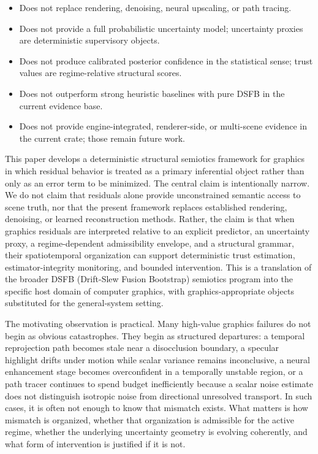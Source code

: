 \documentclass[11pt,letterpaper]{article}
\theoremstyle{gcresult}
\theoremstyle{definition}
\begin{document}
\begin{tcolorbox}[colback=gray!6,colframe=black!35,title={\small\textbf{What this framework does not do}},
  fonttitle=\bfseries,boxrule=0.4pt,left=4pt,right=4pt,top=3pt,bottom=3pt]
\small
\begin{itemize}[leftmargin=1.2em,topsep=2pt,itemsep=1pt]
  \item Does not replace rendering, denoising, neural upscaling, or path tracing.
  \item Does not provide a full probabilistic uncertainty model; uncertainty proxies are deterministic supervisory objects.
  \item Does not produce calibrated posterior confidence in the statistical sense; trust values are regime-relative structural scores.
  \item Does not outperform strong heuristic baselines with pure DSFB in the current evidence base.
  \item Does not provide engine-integrated, renderer-side, or multi-scene evidence in the current crate; those remain future work.
\end{itemize}
\end{tcolorbox}

This paper develops a deterministic structural semiotics framework for graphics in which residual behavior is treated as a primary inferential object rather than only as an error term to be minimized. The central claim is intentionally narrow. We do not claim that residuals alone provide unconstrained semantic access to scene truth, nor that the present framework replaces established rendering, denoising, or learned reconstruction methods. Rather, the claim is that when graphics residuals are interpreted relative to an explicit predictor, an uncertainty proxy, a regime-dependent admissibility envelope, and a structural grammar, their spatiotemporal organization can support deterministic trust estimation, estimator-integrity monitoring, and bounded intervention. This is a translation of the broader DSFB (Drift-Slew Fusion Bootstrap) semiotics program into the specific host domain of computer graphics, with graphics-appropriate objects substituted for the general-system setting. 

The motivating observation is practical. Many high-value graphics failures do not begin as obvious catastrophes. They begin as structured departures: a temporal reprojection path becomes stale near a disocclusion boundary, a specular highlight drifts under motion while scalar variance remains inconclusive, a neural enhancement stage becomes overconfident in a temporally unstable region, or a path tracer continues to spend budget inefficiently because a scalar noise estimate does not distinguish isotropic noise from directional unresolved transport. In such cases, it is often not enough to know that mismatch exists. What matters is how mismatch is organized, whether that organization is admissible for the active regime, whether the underlying uncertainty geometry is evolving coherently, and what form of intervention is justified if it is not.
\end{document}
